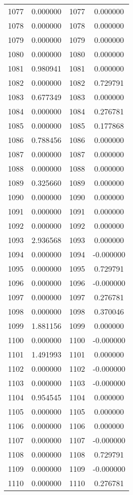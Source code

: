 \documentclass[12pt]{article}
\begin{document}
\begin{longtable}{@{}cccc@{}}
1077 & 0.000000 & 1077 & 0.000000 \\
1078 & 0.000000 & 1078 & 0.000000 \\
1079 & 0.000000 & 1079 & 0.000000 \\
1080 & 0.000000 & 1080 & 0.000000 \\
1081 & 0.980941 & 1081 & 0.000000 \\
1082 & 0.000000 & 1082 & 0.729791 \\
1083 & 0.677349 & 1083 & 0.000000 \\
1084 & 0.000000 & 1084 & 0.276781 \\
1085 & 0.000000 & 1085 & 0.177868 \\
1086 & 0.788456 & 1086 & 0.000000 \\
1087 & 0.000000 & 1087 & 0.000000 \\
1088 & 0.000000 & 1088 & 0.000000 \\
1089 & 0.325660 & 1089 & 0.000000 \\
1090 & 0.000000 & 1090 & 0.000000 \\
1091 & 0.000000 & 1091 & 0.000000 \\
1092 & 0.000000 & 1092 & 0.000000 \\
1093 & 2.936568 & 1093 & 0.000000 \\
1094 & 0.000000 & 1094 & -0.000000 \\
1095 & 0.000000 & 1095 & 0.729791 \\
1096 & 0.000000 & 1096 & -0.000000 \\
1097 & 0.000000 & 1097 & 0.276781 \\
1098 & 0.000000 & 1098 & 0.370046 \\
1099 & 1.881156 & 1099 & 0.000000 \\
1100 & 0.000000 & 1100 & -0.000000 \\
1101 & 1.491993 & 1101 & 0.000000 \\
1102 & 0.000000 & 1102 & -0.000000 \\
1103 & 0.000000 & 1103 & -0.000000 \\
1104 & 0.954545 & 1104 & 0.000000 \\
1105 & 0.000000 & 1105 & 0.000000 \\
1106 & 0.000000 & 1106 & 0.000000 \\
1107 & 0.000000 & 1107 & -0.000000 \\
1108 & 0.000000 & 1108 & 0.729791 \\
1109 & 0.000000 & 1109 & -0.000000 \\
1110 & 0.000000 & 1110 & 0.276781 \\

\end{longtable}
\end{document}
